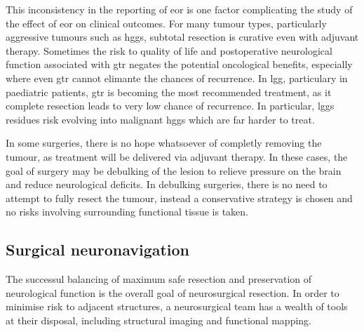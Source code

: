 This inconsistency in the reporting of \gls{eor} is one factor complicating the study of the effect of \gls{eor} on clinical outcomes.
For many tumour types, particularly aggressive tumours such as \glspl{hgg}, subtotal resection is  curative even with adjuvant therapy.
Sometimes the risk to quality of life and postoperative neurological function associated with \gls{gtr} negates the potential oncological benefits, especially where even \gls{gtr} cannot elimante the chances of recurrence.
In \gls{lgg}, particulary in paediatric patients, \gls{gtr} is becoming the most recommended treatment, as it complete resection leads to very low chance of recurrence.
In particular, \glspl{lgg} residues risk evolving into malignant \glspl{hgg} which are far harder to treat.

In some surgeries, there is no hope whatsoever of completly removing the tumour, as treatment will be delivered via adjuvant therapy.
In these cases, the goal of surgery may be debulking of the lesion to relieve pressure on the brain and reduce neurological deficits.
In debulking surgeries, there is no need to attempt to fully resect the tumour, instead a conservative strategy is chosen and no risks involving surrounding functional tissue is taken.

\subsection{Surgical neuronavigation}


The successul balancing of maximum safe resection and preservation of neurological function is the overall goal of neurosurgical resection.
In order to minimise risk to adjacent structures, a neurosurgical team has a wealth of tools at their disposal, including structural imaging and functional mapping.


